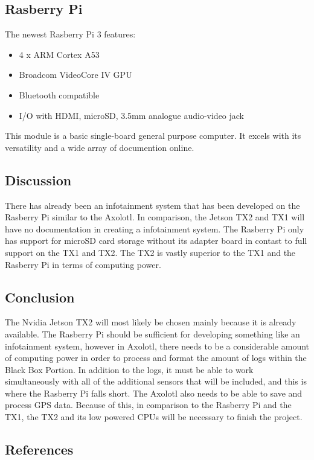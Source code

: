 \documentclass[onecolumn, draftclsnofoot,10pt, compsoc]{IEEEtran}
\begin{document}
\subsection{Rasberry Pi}
The newest Rasberry Pi 3 features:
\begin{itemize}
    \item 4 x ARM Cortex A53
    \item Broadcom VideoCore IV GPU
    \item Bluetooth compatible
    \item I/O with HDMI, microSD, 3.5mm analogue audio-video jack
\end{itemize}
This module is a basic single-board general purpose computer. It excels with its versatility and a wide array of documention online.
~\cite{rasberry:specs}

\subsection{Discussion}
There has already been an infotainment system that has been developed on the Rasberry Pi similar to the Axolotl. In comparison, the Jetson TX2 and TX1 will have no documentation in creating a infotainment system. 
The Rasberry Pi only has support for microSD card storage without its adapter board in contast to full support on the TX1 and TX2. 
The TX2 is vastly superior to the TX1 and the Rasberry Pi in terms of computing power. 

\subsection{Conclusion}
The Nvidia Jetson TX2 will most likely be chosen mainly because it is already available. The Rasberry Pi should be sufficient for developing something like an infotainment system, however in Axolotl, there needs to be a considerable amount of computing power in order to process and format the amount of logs within the Black Box Portion. In addition to the logs, it must be able to work simultaneously with all of the additional sensors that will be included, and this is where the Rasberry Pi falls short. The Axolotl also needs to be able to save and process GPS data. Because of this, in comparison to the Rasberry Pi and the TX1, the TX2 and its low powered CPUs will be necessary to finish the project.

\clearpage
\subsection{References}


\end{document}
